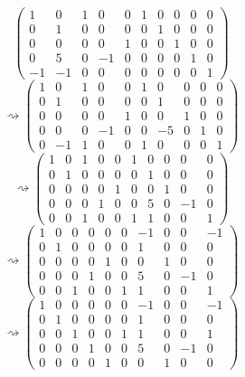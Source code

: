 \documentclass[a4paper,12pt]{article}
\begin{document}
\[
\left(\begin{array}{ccccc|ccccc}
1 & 0 & 1 & 0 & 0 & 1 & 0 & 0 & 0 & 0 \\
0 & 1 & 0 & 0 & 0 & 0 & 1 & 0 & 0 & 0 \\
0 & 0 & 0 & 0 & 1 & 0 & 0 & 1 & 0 & 0 \\
0 & 5 & 0 & -1 & 0 & 0 & 0 & 0 & 1 & 0 \\
-1 & -1 & 0 & 0 & 0 & 0 & 0 & 0 & 0 & 1
\end{array}\right)
\]
\[
\rightsquigarrow
\left(\begin{array}{ccccc|ccccc}
1 & 0 & 1 & 0 & 0 & 1 & 0 & 0 & 0 & 0 \\
0 & 1 & 0 & 0 & 0 & 0 & 1 & 0 & 0 & 0 \\
0 & 0 & 0 & 0 & 1 & 0 & 0 & 1 & 0 & 0 \\
0 & 0 & 0 & -1 & 0 & 0 & -5 & 0 & 1 & 0 \\
0 & -1 & 1 & 0 & 0 & 1 & 0 & 0 & 0 & 1
\end{array}\right)
\]
\[
\rightsquigarrow
\left(\begin{array}{ccccc|ccccc}
1 & 0 & 1 & 0 & 0 & 1 & 0 & 0 & 0 & 0 \\
0 & 1 & 0 & 0 & 0 & 0 & 1 & 0 & 0 & 0 \\
0 & 0 & 0 & 0 & 1 & 0 & 0 & 1 & 0 & 0 \\
0 & 0 & 0 & 1 & 0 & 0 & 5 & 0 & -1 & 0 \\
0 & 0 & 1 & 0 & 0 & 1 & 1 & 0 & 0 & 1
\end{array}\right)
\]
\[
\rightsquigarrow
\left(\begin{array}{ccccc|ccccc}
1 & 0 & 0 & 0 & 0 & 0 & -1 & 0 & 0 & -1 \\
0 & 1 & 0 & 0 & 0 & 0 & 1 & 0 & 0 & 0 \\
0 & 0 & 0 & 0 & 1 & 0 & 0 & 1 & 0 & 0 \\
0 & 0 & 0 & 1 & 0 & 0 & 5 & 0 & -1 & 0 \\
0 & 0 & 1 & 0 & 0 & 1 & 1 & 0 & 0 & 1
\end{array}\right)
\]
\[
\rightsquigarrow
\left(\begin{array}{ccccc|ccccc}
1 & 0 & 0 & 0 & 0 & 0 & -1 & 0 & 0 & -1 \\
0 & 1 & 0 & 0 & 0 & 0 & 1 & 0 & 0 & 0 \\
0 & 0 & 1 & 0 & 0 & 1 & 1 & 0 & 0 & 1 \\
0 & 0 & 0 & 1 & 0 & 0 & 5 & 0 & -1 & 0 \\
0 & 0 & 0 & 0 & 1 & 0 & 0 & 1 & 0 & 0
\end{array}\right)
\]
\end{document}
